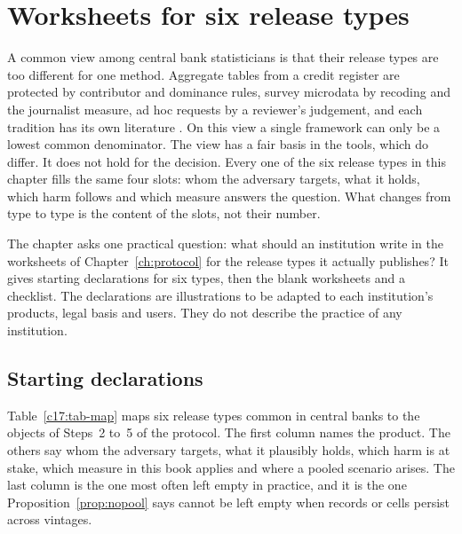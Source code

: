 \chapter{Worksheets for six release types}\label{ch:worksheets}

A common view among central bank statisticians is that their release types are too
different for one method. Aggregate tables from a credit register are protected by
contributor and dominance rules, survey microdata by recoding and the journalist
measure, ad hoc requests by a reviewer's judgement, and each tradition has its own
literature \citep{hundepool2012}. On this view a single framework can only be a
lowest common denominator. The view has a fair basis in the tools, which do differ.
It does not hold for the decision. Every one of the six release types in this chapter
fills the same four slots: whom the adversary targets, what it holds, which harm
follows and which measure answers the question. What changes from type to type is
the content of the slots, not their number.

The chapter asks one practical question: what should an institution write in the
worksheets of Chapter~\ref{ch:protocol} for the release types it actually publishes?
It gives starting declarations for six types, then the blank worksheets and a
checklist. The declarations are illustrations to be adapted to each institution's
products, legal basis and users. They do not describe the practice of any
institution.

\section{Starting declarations}

Table~\ref{c17:tab-map} maps six release types common in central banks to the objects
of Steps~2 to~5 of the protocol. The first column names the product. The others say
whom the adversary targets, what it plausibly holds, which harm is at stake, which
measure in this book applies and where a pooled scenario arises. The last column is
the one most often left empty in practice, and it is the one
Proposition~\ref{prop:nopool} says cannot be left empty when records or cells persist
across vintages.

